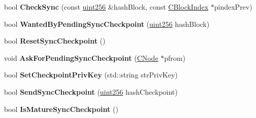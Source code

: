 \begin{DoxyCompactItemize}
\item 
\mbox{\label{namespace_checkpoints_af2f03a7c88a233cb1d33d74aab85746a}} 
bool {\bfseries Check\+Sync} (const \mbox{\hyperlink{classuint256}{uint256}} \&hash\+Block, const \mbox{\hyperlink{class_c_block_index}{C\+Block\+Index}} $\ast$pindex\+Prev)
\item 
\mbox{\label{namespace_checkpoints_a2eed551e1a1a2cd3eca310467a366bab}} 
bool {\bfseries Wanted\+By\+Pending\+Sync\+Checkpoint} (\mbox{\hyperlink{classuint256}{uint256}} hash\+Block)
\item 
\mbox{\label{namespace_checkpoints_a6dd31c2fa96b7cb7978012d17674a06c}} 
bool {\bfseries Reset\+Sync\+Checkpoint} ()
\item 
\mbox{\label{namespace_checkpoints_afe41495b7c21e0e8483a49f297b84135}} 
void {\bfseries Ask\+For\+Pending\+Sync\+Checkpoint} (\mbox{\hyperlink{class_c_node}{C\+Node}} $\ast$pfrom)
\item 
\mbox{\label{namespace_checkpoints_a2f818eaddbab269e7ee33f9ab827ff37}} 
bool {\bfseries Set\+Checkpoint\+Priv\+Key} (std\+::string str\+Priv\+Key)
\item 
\mbox{\label{namespace_checkpoints_a9f6c8a7ddbd2ee310ffecfa1940d2750}} 
bool {\bfseries Send\+Sync\+Checkpoint} (\mbox{\hyperlink{classuint256}{uint256}} hash\+Checkpoint)
\item 
\mbox{\label{namespace_checkpoints_a95edc28445d58d6a56865f55bc4ee7f6}} 
bool {\bfseries Is\+Mature\+Sync\+Checkpoint} ()
\end{DoxyCompactItemize}
